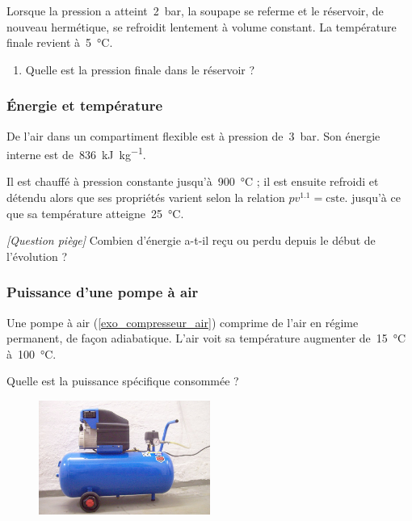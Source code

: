 	Lorsque la pression a atteint~\SI{2}{\bar}, la soupape se referme et le réservoir, de nouveau hermétique, se refroidit lentement à volume constant. La température finale revient à~\SI{5}{\degreeCelsius}.
	
	\begin{enumerate}
		\item Quelle est la pression finale dans le réservoir ?
	\end{enumerate}


\subsubsection{Énergie et température}
\label{exo_gp_energie_temperature}

	De l’air dans un compartiment flexible est à pression de~\SI{3}{\bar}. Son énergie interne est de~\SI{836}{\kilo\joule\per\kilogram}.
	
	Il est chauffé à pression constante jusqu’à~\SI{900}{\degreeCelsius} ; il est ensuite refroidi et détendu alors que ses propriétés varient selon la relation $p v^{\num{1.1}} = \text{cste.}$ jusqu’à ce que sa température atteigne~\SI{25}{\degreeCelsius}.

	\textit{[Question piège]} Combien d’énergie a-t-il reçu ou perdu depuis le début de l’évolution ?

\subsubsection{Puissance d’une pompe à air}
\label{exo_puissance_pompe_air}

	Une pompe à air (\cref{exo_compresseur_air}) comprime de l’air en régime permanent, de façon adiabatique. L’air voit sa température augmenter de~\SI{15}{\degreeCelsius} à~\SI{100}{\degreeCelsius}.
	
	Quelle est la puissance spécifique consommée ?

	\begin{figure}[!bh]
		\begin{center}
			\includegraphics[width=0.5\textwidth]{images/compresseur_air_reservoir.jpg}
		\end{center}
		\label{fig_exo_compresseur_air}
	\end{figure}
	
